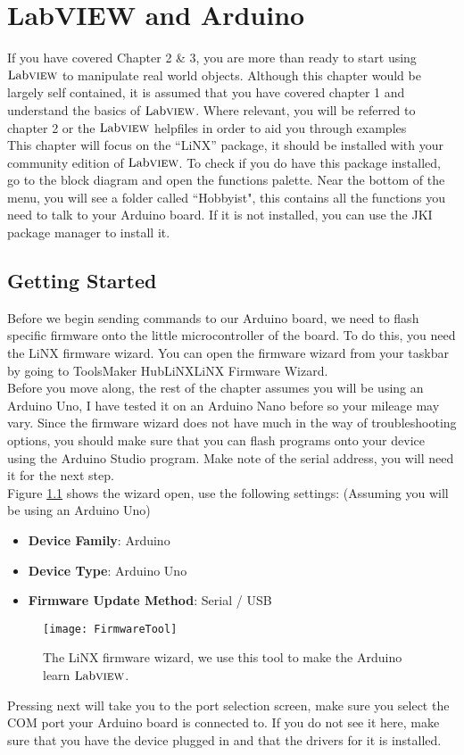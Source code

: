 \chapter{LabVIEW and Arduino}
If you have covered Chapter 2 \& 3, you are more than ready to start using $\text{Lab}\textsc{view}$ to manipulate real world objects. Although this chapter would be largely self contained, it is assumed that you have covered chapter 1 and understand the basics of $\text{Lab}\textsc{view}$. Where relevant, you will be referred to chapter 2 or the $\text{Lab}\textsc{view}$ helpfiles in order to aid you through examples\\

This chapter will focus on the ``LiNX'' package, it should be installed with your community edition of $\text{Lab}\textsc{view}$. To check if you do have this package installed, go to the block diagram and open the functions palette. Near the bottom of the menu, you will see a folder called ``Hobbyist", this contains all the functions you need to talk to your Arduino board. If it is not installed, you can use the JKI package manager to install it.
\section{Getting Started}
Before we begin sending commands to our Arduino board, we need to flash specific firmware onto the little microcontroller of the board. To do this, you need the LiNX firmware wizard. You can open the firmware wizard from your taskbar by going to Tools\textrightarrow Maker Hub\textrightarrow LiNX\textrightarrow LiNX Firmware Wizard.\\

Before you move along, the rest of the chapter assumes you will be using an Arduino Uno, I have tested it on an Arduino Nano before so your mileage may vary. Since the firmware wizard does not have much in the way of troubleshooting options, you should make sure that you can flash programs onto your device using the Arduino Studio program. Make note of the serial address, you will need it for the next step.\\

Figure \ref{FirmwareTool} shows the wizard open, use the following settings: (Assuming you will be using an Arduino Uno)
\begin{itemize}
	\item \textbf{Device Family}: Arduino
	\item \textbf{Device Type}: Arduino Uno
	\item \textbf{Firmware Update Method}: Serial / USB
\end{itemize}
\begin{figure}
	\centering
	\texttt{[image: FirmwareTool]}
	\caption{The LiNX firmware wizard, we use this tool to make the Arduino learn $\text{Lab}\textsc{view}$.}
	\label{FirmwareTool}
\end{figure}
Pressing next will take you to the port selection screen, make sure you select the COM port your Arduino board is connected to. If you do not see it here, make sure that you have the device plugged in and that the drivers for it is installed.\\

